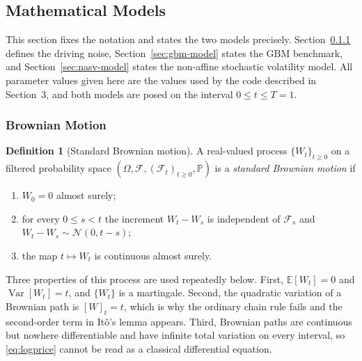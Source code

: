 \documentclass[11pt,a4paper]{article}
\theoremstyle{definition}
\newtheorem{definition}[theorem]{Definition}
\theoremstyle{remark}
\begin{document}
\subsection{Mathematical Models}
\label{sec:models}

This section fixes the notation and states the two models precisely.
Section~\ref{sec:bm} defines the driving noise, Section~\ref{sec:gbm-model}
states the GBM benchmark, and Section~\ref{sec:nasv-model} states the
non-affine stochastic volatility model. All parameter values given here are the
values used by the code described in Section~3, and both models are posed on
the interval $0 \le t \le T = 1$.

\subsubsection{Brownian Motion}
\label{sec:bm}

\begin{definition}[Standard Brownian motion]
\label{def:bm}
A real-valued process $\{W_t\}_{t \ge 0}$ on a filtered probability space
$(\Omega, \mathcal{F}, (\mathcal{F}_t)_{t \ge 0}, \mathbb{P})$ is a
\emph{standard Brownian motion} if
\begin{enumerate}[label=(\roman*), leftmargin=2em]
    \item $W_0 = 0$ almost surely;
    \item for every $0 \le s < t$ the increment $W_t - W_s$ is independent of
          $\mathcal{F}_s$ and $W_t - W_s \sim \mathcal{N}(0, t - s)$;
    \item the map $t \mapsto W_t$ is continuous almost surely.
\end{enumerate}
\end{definition}

Three properties of this process are used repeatedly below. First,
$\mathbb{E}[W_t] = 0$ and $\operatorname{Var}[W_t] = t$, and $\{W_t\}$ is a
martingale. Second, the quadratic variation of a Brownian path is
$[W]_t = t$, which is why the ordinary chain rule fails and the second-order
term in It\^o's lemma appears. Third, Brownian paths are continuous but nowhere
differentiable and have infinite total variation on every interval, so
\eqref{eq:logprice} cannot be read as a classical differential equation.
\end{document}
